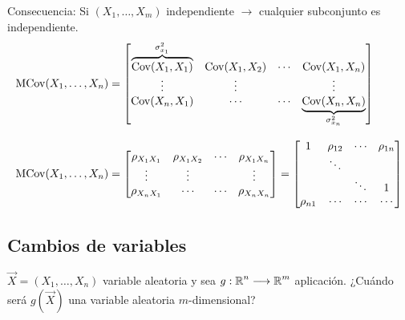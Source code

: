 Consecuencia: Si $(X_1,\dots,X_m)$ independiente $\longrightarrow$ cualquier subconjunto es independiente. \[ \begin{array}{l}
	\mathrm{MCov}(X_1,\dots,X_n)=\begin{bmatrix}
		\overbrace{\operatorname{Cov}(X_1,X_1)}^{\sigma_{x_1}^2} & \operatorname{Cov}(X_1,X_2) & \cdots & \operatorname{Cov}(X_1,X_n)\\
		\vdots & \vdots & & \vdots\\
		\operatorname{Cov}(X_n,X_1) & \cdots & \cdots & \underbrace{\operatorname{Cov}(X_n,X_n)}_{\sigma_{x_n}^2}
	\end{bmatrix}\\
	\\
	\mathrm{MCov}(X_1,\dots,X_n)=\begin{bmatrix}
		\rho_{X_1X_1} & \rho_{X_1X_2} & \cdots & \rho_{X_1X_n}\\
		\vdots & \vdots & & \vdots\\
		\rho_{X_nX_1} & \cdots & \cdots & \rho_{X_nX_n}
	\end{bmatrix}=\begin{bmatrix}
	1 & \rho_{12} & \cdots & \rho_{1n}\\
	 & \ddots & & \\
	 & & \ddots & 1\\
	 \rho_{n1} & \cdots & \cdots& \cdots 
	\end{bmatrix}
\end{array} \]
\subsection{Cambios de variables}
$\vec{X}=(X_1,\dots,X_n)$ variable aleatoria y sea $g:\operatorname{\mathbb{R}}^n\longrightarrow\operatorname{\mathbb{R}}^m$ aplicación. ¿Cuándo será $g(\vec{X})$ una variable aleatoria $m$-dimensional?

